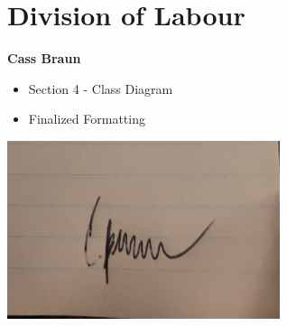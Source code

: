 \documentclass[]{article}
\numberwithin{figure}{section}
\begin{document}
\appendix
\section{Division of Labour}
\label{sec:division_of_labour}



\textbf{Cass Braun}
\begin{itemize}
    \setlength\itemindent{2em}
    \item Section 4 - Class Diagram
    \item Finalized Formatting
\end{itemize}
\includegraphics[width=0.6\textwidth]{Cass.jpg}
\end{document}
